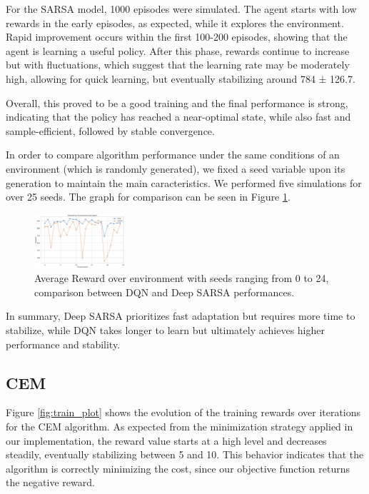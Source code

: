 \documentclass[../CSC_52081_EP.tex]{subfiles}
\begin{document}
For the SARSA model, 1000 episodes were simulated. The agent starts with low rewards in the early episodes, as expected, while it explores the environment. Rapid improvement occurs within the first 100-200 episodes, showing that the agent is learning a useful policy. After this phase, rewards continue to increase but with fluctuations, which suggest that the learning rate may be moderately high, allowing for quick learning, but eventually stabilizing around 784 ± 126.7.

Overall, this proved to be a good training and the final performance is strong, indicating that the policy has reached a near-optimal state, while also fast and sample-efficient, followed by stable convergence.

In order to compare algorithm performance under the same conditions of an environment (which is randomly generated), we fixed a seed variable upon its generation to maintain the main caracteristics.
We performed five simulations for over 25 seeds. The graph for comparison can be seen in Figure \ref{fig:SARSA_DQN_comparison}.

\begin{figure}[H]
    \centering
    \includegraphics[width=0.3\textwidth]{figures/output_4.png}
    \caption{Average Reward over environment with seeds ranging from 0 to 24, comparison between DQN and Deep SARSA performances.}
    \label{fig:SARSA_DQN_comparison}
\end{figure}

In summary, Deep SARSA prioritizes fast adaptation but requires more time to stabilize, while DQN takes longer to learn but ultimately achieves higher performance and stability.

\subsection{CEM}

Figure \ref{fig:train_plot} shows the evolution of the training rewards over iterations for the CEM algorithm. As expected from the minimization strategy applied in our implementation, the reward value starts at a high level and decreases steadily, eventually stabilizing between 5 and 10. This behavior indicates that the algorithm is correctly minimizing the cost, since our objective function returns the negative reward.
\end{document}
